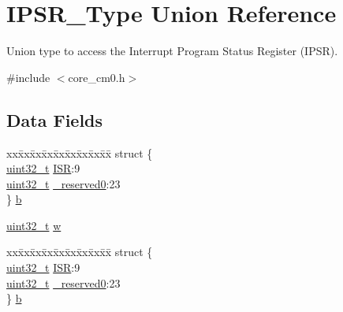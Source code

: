 \hypertarget{union_i_p_s_r___type}{\section{I\-P\-S\-R\-\_\-\-Type Union Reference}
\label{union_i_p_s_r___type}
}


Union type to access the Interrupt Program Status Register (I\-P\-S\-R).  




{\ttfamily \#include $<$core\-\_\-cm0.\-h$>$}

\subsection*{Data Fields}
\begin{DoxyCompactItemize}
\item 
\begin{tabbing}
xx\=xx\=xx\=xx\=xx\=xx\=xx\=xx\=xx\=\kill
struct \{\\
\>\hyperlink{stdint_8h_a435d1572bf3f880d55459d9805097f62}{uint32\_t} \hyperlink{union_i_p_s_r___type_ab46e5f1b2f4d17cfb9aca4fffcbb2fa5}{ISR}:9\\
\>\hyperlink{stdint_8h_a435d1572bf3f880d55459d9805097f62}{uint32\_t} \hyperlink{union_i_p_s_r___type_ad2eb0a06de4f03f58874a727716aa9aa}{\_reserved0}:23\\
\} \hyperlink{union_i_p_s_r___type_a8694433a871ae74beeb7aa9abeea37bb}{b}\\

\end{tabbing}\item 
\hyperlink{stdint_8h_a435d1572bf3f880d55459d9805097f62}{uint32\-\_\-t} \hyperlink{union_i_p_s_r___type_a4adca999d3a0bc1ae682d73ea7cfa879}{w}
\item 
\begin{tabbing}
xx\=xx\=xx\=xx\=xx\=xx\=xx\=xx\=xx\=\kill
struct \{\\
\>\hyperlink{stdint_8h_a435d1572bf3f880d55459d9805097f62}{uint32\_t} \hyperlink{union_i_p_s_r___type_ab46e5f1b2f4d17cfb9aca4fffcbb2fa5}{ISR}:9\\
\>\hyperlink{stdint_8h_a435d1572bf3f880d55459d9805097f62}{uint32\_t} \hyperlink{union_i_p_s_r___type_ad2eb0a06de4f03f58874a727716aa9aa}{\_reserved0}:23\\
\} \hyperlink{union_i_p_s_r___type_a81feb1bfa01fe99ebcce023b63b9b247}{b}\\


\end{tabbing}
\end{DoxyCompactItemize}
